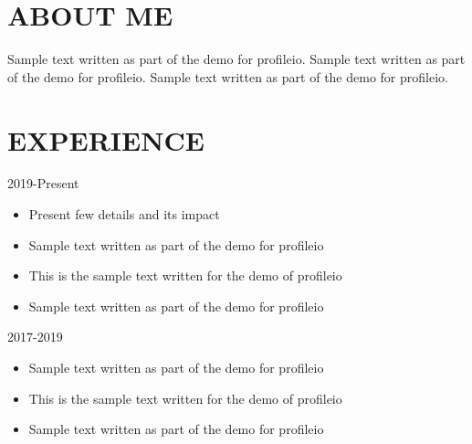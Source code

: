\documentclass{res}
\begin{document}
	\begin{resume}
	
	
	\section{\MakeUppercase{About me}} \vskip 0.15in
	Sample text written as part of the demo for profileio. Sample text written as part of the demo for profileio. Sample text written as part of the demo for profileio.
	
	
	
	\section{\MakeUppercase{Experience}} \vskip 0.15in
	
	\hspace*{-0.25in}{\bf Senior Software Engineer} \hfill 2019-Present \\
	\hspace*{-0.25in}{\it Walt Disney Animation Studios, Burbank, CA}
	\begin{itemize}[leftmargin=\parindent]
	\setlength{\itemsep}{0mm} \smallskip
	
		\item Present few details and its impact
		\item Sample text written as part of the demo for profileio
		\item This is the sample text written for the demo of profileio
		\item Sample text written as part of the demo for profileio
	\end{itemize}
	
	\hspace*{-0.25in}{\bf Software Engineer} \hfill 2017-2019 \\
	\hspace*{-0.25in}{\it Dreamworks Animation, Glendale, CA}
	\begin{itemize}[leftmargin=\parindent]
	\setlength{\itemsep}{0mm} \smallskip
	
		\item Sample text written as part of the demo for profileio
		\item This is the sample text written for the demo of profileio
		\item Sample text written as part of the demo for profileio
	\end{itemize}
	

\end{resume}
\end{document}
